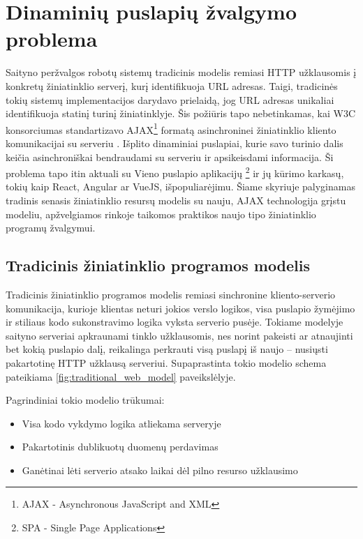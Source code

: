 \section{Dinaminių puslapių žvalgymo problema}

Saityno peržvalgos robotų sistemų tradicinis modelis remiasi HTTP užklausomis į konkretų žiniatinklio serverį, kurį identifikuoja URL adresas. Taigi, tradicinės tokių sistemų implementacijos darydavo prielaidą, jog URL adresas unikaliai identifikuoja statinį turinį žiniatinklyje. Šis požiūris tapo nebetinkamas, kai W3C konsorciumas standartizavo AJAX\footnote{AJAX - Asynchronous JavaScript and XML} formatą asinchroninei žiniatinklio kliento komunikacijai su serveriu \cite{AJAXCrawlResearch}. Išplito dinaminiai puslapiai, kurie savo turinio dalis keičia asinchroniškai bendraudami su serveriu ir apsikeisdami informacija. Ši problema tapo itin aktuali su Vieno puslapio aplikacijų \footnote{SPA - Single Page Applications} ir jų kūrimo karkasų, tokių kaip React, Angular ar VueJS, išpopuliarėjimu. Šiame skyriuje palyginamas tradinis senasis žiniatinklio resursų modelis su nauju, AJAX technologija grįstu modeliu, apžvelgiamos rinkoje taikomos praktikos naujo tipo žiniatinklio programų žvalgymui.

\subsection{Tradicinis žiniatinklio programos modelis}

Tradicinis žiniatinklio programos modelis remiasi sinchronine kliento-serverio komunikacija, kurioje klientas neturi jokios verslo logikos, visa puslapio žymėjimo ir stiliaus kodo sukonstravimo logika vyksta serverio pusėje. Tokiame modelyje saityno serveriai apkraunami tinklo užklausomis, nes norint pakeisti ar atnaujinti bet kokią puslapio dalį, reikalinga perkrauti visą puslapį iš naujo -- nusiųsti pakartotinę HTTP užklausą serveriui. Supaprastinta tokio modelio schema pateikiama \ref{fig:traditional_web_model} paveikslėlyje. 



Pagrindiniai tokio modelio trūkumai:
\begin{itemize}
    \item Visa kodo vykdymo logika atliekama serveryje
    \item Pakartotinis dublikuotų duomenų perdavimas
    \item Ganėtinai lėti serverio atsako laikai dėl pilno resurso užklausimo
\end{itemize}

